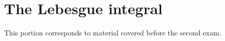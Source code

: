 \section{The Lebesgue integral}
This portion corresponds to material covered before the second exam.

